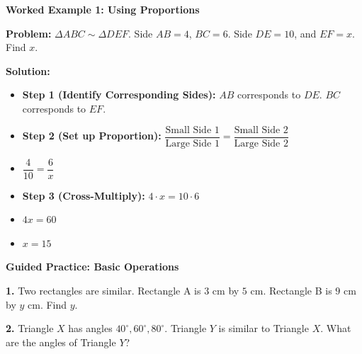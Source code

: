 \documentclass[12pt, letterpaper, fleqn]{article}
\begin{document}
\begin{tcolorbox}[colback=white, colframe=black!25, boxrule=0.6pt, arc=4mm, left=6mm, right=6mm, top=5mm, bottom=5mm]

\textbf{Worked Example 1: Using Proportions}

\medskip

\textbf{Problem:} $\Delta ABC \sim \Delta DEF$. Side $AB = 4$, $BC = 6$. Side $DE = 10$, and $EF = x$. Find $x$.

\medskip

\textbf{Solution:}
\begin{itemize}
    \item \textbf{Step 1 (Identify Corresponding Sides):} $AB$ corresponds to $DE$. $BC$ corresponds to $EF$.
    \item \textbf{Step 2 (Set up Proportion):} $\dfrac{\text{Small Side 1}}{\text{Large Side 1}} = \dfrac{\text{Small Side 2}}{\text{Large Side 2}}$
    \item $\dfrac{4}{10} = \dfrac{6}{x}$
    \item \textbf{Step 3 (Cross-Multiply):} $4 \cdot x = 10 \cdot 6$
    \item $4x = 60$
    \item $x = 15$
\end{itemize}

\end{tcolorbox}

\vspace{4mm}

\begin{tcolorbox}[colback=white!15, colframe=black, boxrule=1.5pt, arc=4mm, left=6mm, right=6mm, top=5mm, bottom=5mm]

\textbf{Guided Practice: Basic Operations}

\medskip

\noindent
\textbf{1.} Two rectangles are similar. Rectangle A is $3\text{ cm}$ by $5\text{ cm}$. Rectangle B is $9\text{ cm}$ by $y\text{ cm}$. Find $y$.
\vspace{2cm}

\noindent
\textbf{2.} Triangle $X$ has angles $40^\circ, 60^\circ, 80^\circ$. Triangle $Y$ is similar to Triangle $X$. What are the angles of Triangle $Y$?
\vspace{1.5cm}

\end{tcolorbox}
\end{document}
